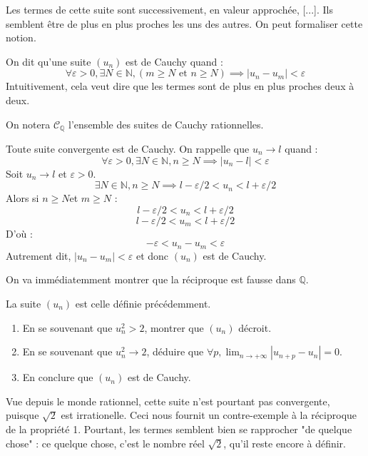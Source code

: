 Les termes de cette suite sont successivement, en valeur approchée, [...]. Ils semblent être de plus en plus proches les uns des autres. On peut formaliser cette notion.

\begin{defini}
On dit qu'une suite $(u_n)$ est de Cauchy quand :
$$\forall \varepsilon > 0, \exists N \in \mathbb{N}, (m \geq N \text{ et } n \geq N) \implies |u_n-u_m| < \varepsilon$$
Intuitivement, cela veut dire que les termes sont de plus en plus proches deux à deux.

On notera $\mathcal{C}_{\mathbb{Q}}$ l'ensemble des suites de Cauchy rationnelles.
\end{defini}

\begin{prop}
Toute suite convergente est de Cauchy.
\tcblower
On rappelle que $u_n \to l$ quand :
$$\forall \varepsilon > 0, \exists N \in \mathbb{N}, n \geq N \implies |u_n-l| < \varepsilon$$
Soit $u_n \to l$ et $\varepsilon > 0$.
$$\exists N \in \mathbb{N}, n \geq N \implies l-\varepsilon/2 < u_n < l+\varepsilon/2$$
Alors si $n \geq N$et $m \geq  N$ :
$$l-\varepsilon/2 < u_n < l+\varepsilon/2$$
$$l-\varepsilon/2 < u_m < l+\varepsilon/2$$
D'où :
$$-\varepsilon < u_n-u_m < \varepsilon$$
Autrement dit, $|u_n-u_m|<\varepsilon$ et donc $(u_n)$ est de Cauchy.
\end{prop}    

On va immédiatemment montrer que la réciproque est fausse dans $\mathbb{Q}$.

\begin{exo}
La suite $(u_n)$ est celle définie précédemment.
\begin{enumerate}[font=\color{blue!50!green}]
\item En se souvenant que $u_n^2>2$, montrer que $(u_n)$ décroit.
\item En se souvenant que $u_n^2 \to 2$, déduire que $\displaystyle\forall p,\lim_{n\to+\infty} |u_{n+p}-u_n| = 0$.
\item En conclure que $(u_n)$ est de Cauchy.
\end{enumerate}
\end{exo}

Vue depuis le monde rationnel, cette suite n'est pourtant pas convergente, puisque $\sqrt{2}$ est irrationelle. Ceci nous fournit un contre-exemple à la réciproque de la propriété 1. 
Pourtant, les termes semblent bien se rapprocher "de quelque chose" : ce quelque chose, c'est le nombre réel $\sqrt{ 2 }$, qu'il reste encore à définir.

